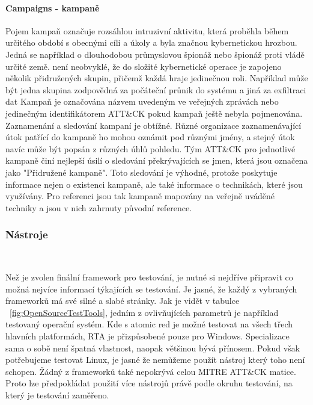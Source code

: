 \paragraph{Campaigns - kampaně}
Pojem kampaň označuje rozsáhlou intruzivní aktivitu, která proběhla během určitého období s obecnými cíli a úkoly a byla značnou kybernetickou hrozbou.
Jedná se například o dlouhodobou průmyslovou špionáž nebo špionáž proti vládě určité země.
není neobvyklé, že do složité kybernetické operace je zapojeno několik přidružených skupin, přičemž každá hraje jedinečnou roli.
Například může být jedna skupina zodpovědná za počáteční průnik do systému a jiná za exfiltraci dat
Kampaň je označována názvem uvedeným ve veřejných zprávách nebo jedinečným identifikátorem ATT\&CK pokud kampaň ještě nebyla pojmenována.
Zaznamenání a sledování kampaní je obtížné.
Různé organizace zaznamenávající útok patřící do kampaně ho mohou oznámit pod různými jmény, a stejný útok navíc může být popsán z různých úhlů pohledu.
Tým ATT\&CK pro jednotlivé kampaně činí nejlepší úsilí o sledování překrývajících se jmen, která jsou označena jako "Přidružené kampaně".
Toto sledování je výhodné, protože poskytuje informace nejen o existenci kampaně, ale také informace o technikách, které jsou využívány.
Pro referenci jsou tak kampaně mapovány na veřejně uváděné techniky a jsou v nich zahrnuty původní reference.\cite{Mitre_campaigns}

\subsubsection{Nástroje}
~\label{fig:OpenSourceTestTools}

Než je zvolen finální framework pro testování, je nutné si nejdříve připravit co možná nejvíce informací týkajících se testování.
Je jasné, že každý z vybraných frameworků má své silné a slabé stránky.
Jak je vidět v tabulce ~\ref{fig:OpenSourceTestTools}, jedním z ovlivňujících parametrů je například testovaný operační systém.
Kde s atomic red je možné testovat na všech třech hlavních platformách, \ac{RTA} je přizpůsobené pouze pro Windows.
Specializace sama o sobě není špatná vlastnost, naopak většinou bývá přínosem.
Pokud však potřebujeme testovat Linux, je jasné že nemůžeme použít nástroj který toho není schopen.
Žádný z frameworků také nepokrývá celou MITRE ATT\&CK matice.
Proto lze předpokládat použití více nástrojů právě podle okruhu testování, na který je testování zaměřeno.

